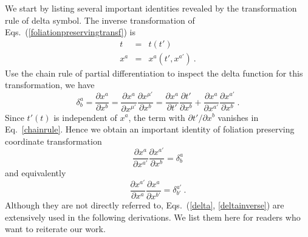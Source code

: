 We start by listing several important identities revealed by the transformation rule of delta symbol. The inverse transformation of Eqs.~(\ref{foliationpreservingtransf}) is  
\begin{subequations}
\begin{eqnarray}
t & = & t(t')\\
x^{a} & = & x^{a}(t',x^{a'}) \ .
\end{eqnarray}
\end{subequations}
Use the chain rule of partial differentiation to inspect the delta function for this transformation, we have
\begin{equation}\label{chainrule}
\delta^{a}_{b} = \frac{\partial x^{a}}{\partial x^{b}} = \frac{\partial x^{a}}{\partial x^{\mu'}}\frac{\partial x^{\mu'}}{\partial x^{b}} = \frac{\partial x^{a}}{\partial t'}\frac{\partial t'}{\partial x^{b}} + \frac{\partial x^{a}}{\partial x^{a'}}\frac{\partial x^{a'}}{\partial x^{b}} \ .
\end{equation}
Since $t'\left(t\right)$ is independent of $x^{a}$, the term with $\partial t'/\partial x^{b}$ vanishes in Eq.~\ref{chainrule}. Hence we obtain an important identity of foliation preserving coordinate transformation
\begin{equation}\label{delta}
\frac{\partial x^{a}}{\partial x^{a'}}\frac{\partial x^{a'}}{\partial x^{b}} = \delta^{a}_{b}
\end{equation}
and equivalently
\begin{equation}\label{deltainverse}
\frac{\partial x^{a'}}{\partial x^{a}}\frac{\partial x^{a}}{\partial x^{b'}} = \delta^{a'}_{b'} \ .
\end{equation}
Although they are not directly referred to, Eqs.~(\ref{delta}, \ref{deltainverse}) are extensively used in the following derivations. We list them here for readers who want to reiterate our work. 

